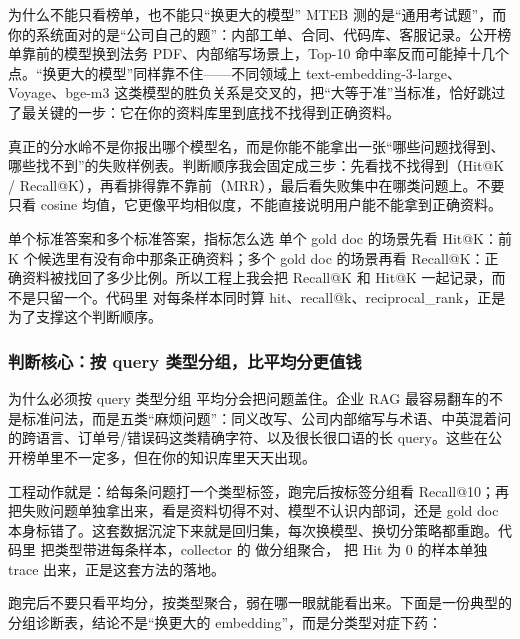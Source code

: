 \documentclass[12pt]{article}
\begin{document}
\begin{analysisBox}{为什么不能只看榜单，也不能只“换更大的模型”}
MTEB 测的是“通用考试题”，而你的系统面对的是“公司自己的题”：内部工单、合同、代码库、客服记录。公开榜单靠前的模型换到法务 PDF、内部缩写场景上，Top-10 命中率反而可能掉十几个点。“换更大的模型”同样靠不住——不同领域上 text-embedding-3-large、Voyage、bge-m3 这类模型的胜负关系是交叉的，把“大等于准”当标准，恰好跳过了最关键的一步：它在你的资料库里到底找不找得到正确资料。

真正的分水岭不是你报出哪个模型名，而是你能不能拿出一张“哪些问题找得到、哪些找不到”的失败样例表。判断顺序我会固定成三步：先看找不找得到（Hit@K / Recall@K），再看排得靠不靠前（MRR），最后看失败集中在哪类问题上。不要只看 cosine 均值，它更像平均相似度，不能直接说明用户能不能拿到正确资料。
\end{analysisBox}

\begin{qaBox}{单个标准答案和多个标准答案，指标怎么选}
单个 gold doc 的场景先看 Hit@K：前 K 个候选里有没有命中那条正确资料；多个 gold doc 的场景再看 Recall@K：正确资料被找回了多少比例。所以工程上我会把 Recall@K 和 Hit@K 一起记录，而不是只留一个。代码里  对每条样本同时算 hit、recall@k、reciprocal\_rank，正是为了支撑这个判断顺序。
\end{qaBox}

\subsubsection*{判断核心：按 query 类型分组，比平均分更值钱}

\begin{analysisBox}{为什么必须按 query 类型分组}
平均分会把问题盖住。企业 RAG 最容易翻车的不是标准问法，而是五类“麻烦问题”：同义改写、公司内部缩写与术语、中英混着问的跨语言、订单号/错误码这类精确字符、以及很长很口语的长 query。这些在公开榜单里不一定多，但在你的知识库里天天出现。

工程动作就是：给每条问题打一个类型标签，跑完后按标签分组看 Recall@10；再把失败问题单独拿出来，看是资料切得不对、模型不认识内部词，还是 gold doc 本身标错了。这套数据沉淀下来就是回归集，每次换模型、换切分策略都重跑。代码里  把类型带进每条样本，collector 的  做分组聚合， 把 Hit 为 0 的样本单独 trace 出来，正是这套方法的落地。
\end{analysisBox}

跑完后不要只看平均分，按类型聚合，弱在哪一眼就能看出来。下面是一份典型的分组诊断表，结论不是“换更大的 embedding”，而是分类型对症下药：
\end{document}
